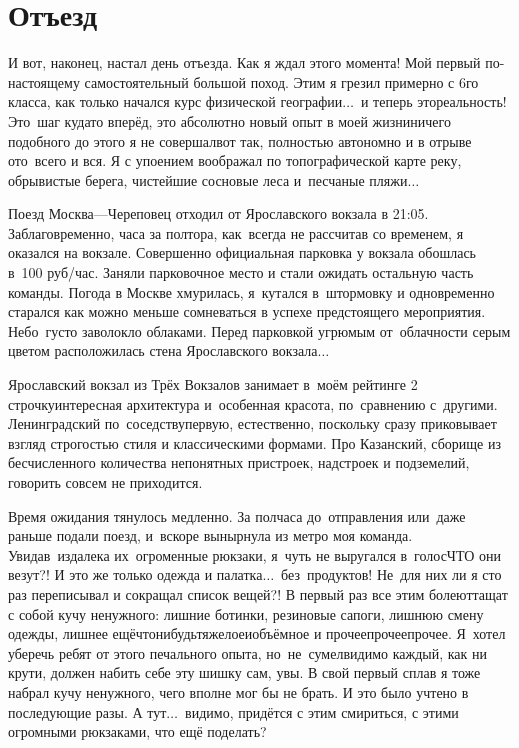 \chapter{Отъезд}

И вот, наконец, настал день отъезда. Как я ждал этого момента! Мой первый по-настоящему самостоятельный большой поход. Этим я грезил примерно с 6\sdash го класса, как только начался курс физической географии$\ldots$~и теперь это\mdash реальность! Это~шаг куда\sdash то вперёд, это абсолютно новый опыт в моей жизни\mdash ничего подобного до этого я не совершал\mdash вот так, полностью автономно и в отрыве ото~всего и вся. Я с упоением воображал по топографической карте реку, обрывистые берега, чистейшие сосновые леса и~песчаные пляжи$\ldots$ 

Поезд Москва\thinspace---\thinspace Череповец отходил от Ярославского вокзала в 21:05. Заблаговременно, часа за полтора, как~всегда не рассчитав со временем, я оказался на вокзале. Совершенно официальная парковка у вокзала обошлась в~100 руб/час. Заняли парковочное место и стали ожидать остальную часть команды. Погода в Москве хмурилась, я~кутался в~штормовку и одновременно старался как можно меньше сомневаться в успехе предстоящего мероприятия. Небо~густо заволокло облаками. Перед парковкой угрюмым от~облачности серым цветом расположилась стена Ярославского вокзала$\ldots$

Ярославский вокзал из Трёх Вокзалов занимает в~моём рейтинге 2 строчку\mdash интересная архитектура и~особенная красота, по~сравнению с~другими. Ленинградский по~соседству\mdash первую, естественно, поскольку сразу приковывает взгляд строгостью стиля и классическими формами. Про Казанский, сборище из бесчисленного количества непонятных пристроек, надстроек и подземелий, говорить совсем не приходится.

Время ожидания тянулось медленно. За полчаса до~отправления или~даже раньше подали поезд, и~вскоре вынырнула из метро моя команда. Увидав~издалека их~огроменные рюкзаки, я~чуть не выругался в~голос\mdash ЧТО они везут?! И это же только одежда и палатка$\ldots$~без~продуктов! Не~для них ли я сто раз переписывал и сокращал список вещей?! В первый раз все этим болеют\mdash тащат с собой кучу ненужного: лишние ботинки, резиновые сапоги, лишнюю смену одежды, лишнее ещё\sdash что\sdash нибудь\sdash тяжелое\sdash и\sdash объёмное и прочее\sdash прочее\sdash прочее. Я~хотел уберечь ребят от этого печального опыта, но~не~сумел\mdash видимо каждый, как ни крути, должен набить себе эту шишку сам, увы. В свой первый сплав я тоже набрал кучу ненужного, чего вполне мог бы не брать. И это было учтено в последующие разы. А тут$\ldots$~видимо, придётся с этим смириться, с этими огромными рюкзаками, что ещё поделать?

